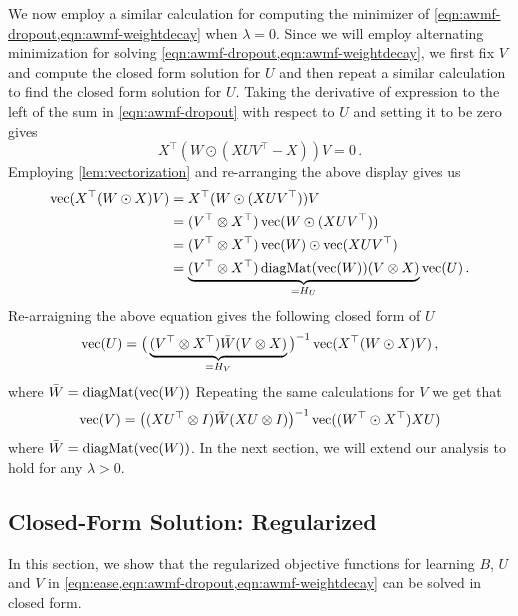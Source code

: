 We now employ a similar calculation for computing the minimizer of \cref{eqn:awmf-dropout,eqn:awmf-weightdecay} when $\lambda = 0$. Since we will employ alternating minimization for solving \cref{eqn:awmf-dropout,eqn:awmf-weightdecay}, we first fix $V$ and compute the closed form solution for $U$ and then repeat a similar calculation to find the closed form solution for $U$. Taking the derivative of expression to the left of the sum in \cref{eqn:awmf-dropout} with respect to $U$ and setting it to be zero gives
\begin{equation*}
    X^\top(W\odot(XUV^\top - X))V = 0\,.
\end{equation*}
Employing \cref{lem:vectorization} and re-arranging the above display gives us
\begin{align*}
    \operatorname{vec}(X^\top(W\odot X)V) &=  X^\top(W\odot(XUV^\top))V \\
    &= (V^\top\otimes X^\top)\operatorname{vec}(W\odot(XUV^\top))\\
    &= (V^\top\otimes X^\top)\operatorname{vec}(W)\odot\operatorname{vec}(XUV^\top)\\
    &= \underbrace{(V^\top\otimes X^\top)\operatorname{diagMat}(\operatorname{vec}(W))(V\otimes X)}_{=H_U}\operatorname{vec}(U)\,.
\end{align*}
Re-arraigning the above equation gives the following closed form of $U$
\begin{align}\label{eqn:awmfU-soln}
    \operatorname{vec}(U)
    = \big(\underbrace{(V^\top\otimes X^\top)\bar{W}(V\otimes X)}_{=H_V}\big)^{-1} \operatorname{vec}(X^\top(W\odot X)V)\,,
\end{align}
where $\bar{W} = \operatorname{diagMat}(\operatorname{vec}(W))$
Repeating the same calculations for $V$ we get that
\begin{equation}\label{eqn:awmfV-soln}
    \operatorname{vec}(V) = \big((XU^\top \otimes I)\bar{W}(XU\otimes I)\big)^{-1} \operatorname{vec}((W^\top\odot X^\top)XU)
\end{equation}
where $\bar{W} = \operatorname{diagMat}(\operatorname{vec}(W))$. In the next section, we will extend our analysis to hold for any $\lambda > 0$. 
\subsection{Closed-Form Solution: Regularized}
In this section, we show that the regularized objective functions for learning $B$, $U$ and $V$ in \cref{eqn:ease,eqn:awmf-dropout,eqn:awmf-weightdecay} can be solved in closed form.

